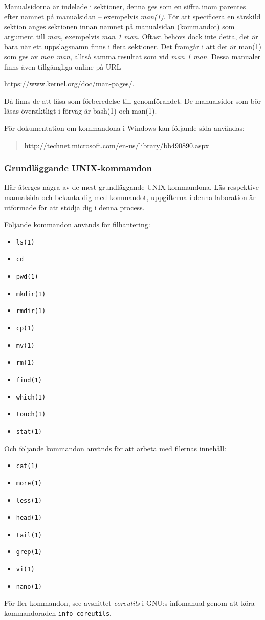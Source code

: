 Manualsidorna är indelade i sektioner, denna ges som en siffra inom parentes 
efter namnet på manualsidan -- exempelvis \emph{man(1)}.
För att specificera en särskild sektion anges sektionen innan namnet på 
manualsidan (kommandot) som argument till \emph{man}, exempelvis \emph{man 
1 man}.
Oftast behövs dock inte detta, det är bara när ett uppslagsnamn finns i flera 
sektioner.
Det framgår i  att det är man(1) som ges av \emph{man 
man}, alltså samma resultat som vid \emph{man 1 man}.
Dessa manualer finns även tillgängliga online på URL
\begin{center}
	\url{https://www.kernel.org/doc/man-pages/}.
\end{center}
Då finns de att läsa som förberedelse till genomförandet.
De manualsidor som bör läsas översiktligt i förväg är bash(1) och man(1).

För dokumentation om kommandona i Windows kan följande sida användas:
\begin{quote}
	\url{http://technet.microsoft.com/en-us/library/bb490890.aspx}
\end{quote}

\subsubsection{Grundläggande UNIX-kommandon}
Här återges några av de mest grundläggande UNIX-kommandona.
Läs respektive manualsida och bekanta dig med kommandot, uppgifterna i denna 
laboration är utformade för att stödja dig i denna process.

Följande kommandon används för filhantering:
\begin{itemize}
  \item \texttt{ls(1)}
  \item \texttt{cd}
  \item \texttt{pwd(1)}
  \item \texttt{mkdir(1)}
  \item \texttt{rmdir(1)}
  \item \texttt{cp(1)}
  \item \texttt{mv(1)}
  \item \texttt{rm(1)}
  \item \texttt{find(1)}
  \item \texttt{which(1)}
  \item \texttt{touch(1)}
  \item \texttt{stat(1)}
\end{itemize}

Och följande kommandon används för att arbeta med filernas innehåll:
\begin{itemize}
  \item \texttt{cat(1)}
  \item \texttt{more(1)}
  \item \texttt{less(1)}
  \item \texttt{head(1)}
  \item \texttt{tail(1)}
  \item \texttt{grep(1)}
  \item \texttt{vi(1)}
  \item \texttt{nano(1)}
\end{itemize}

För fler kommandon, see avsnittet \emph{coreutils} i GNU:s infomanual genom att 
köra kommandoraden \texttt{info coreutils}.

